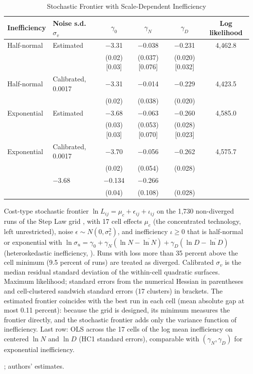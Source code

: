 \begin{table}[tp]
\centering
\caption{Stochastic Frontier with Scale-Dependent Inefficiency}
\label{tab:app-sfa}
\footnotesize
\setlength{\tabcolsep}{4pt}
\begin{tabular}{@{}llcccc@{}}
\toprule
Inefficiency & Noise s.d.\ $\sigma_v$ & $\gamma_0$ & $\gamma_N$ & $\gamma_D$ & Log likelihood \\
\midrule
Half-normal & Estimated & $-$3.31 & $-$0.038 & $-$0.231 & 4,462.8 \\
 & & (0.02) [0.03] & (0.037) [0.076] & (0.020) [0.032] & \\
Half-normal & Calibrated, 0.0017 & $-$3.31 & $-$0.014 & $-$0.229 & 4,423.5 \\
 & & (0.02) & (0.038) & (0.020) & \\
Exponential & Estimated & $-$3.68 & $-$0.063 & $-$0.260 & 4,585.0 \\
 & & (0.03) [0.03] & (0.053) [0.070] & (0.028) [0.023] & \\
Exponential & Calibrated, 0.0017 & $-$3.70 & $-$0.056 & $-$0.262 & 4,575.7 \\
 & & (0.02) & (0.054) & (0.028) & \\
\addlinespace
\multicolumn{2}{@{}l}{Cell-level OLS of $\ln\bar\iota_c$} & $-$3.68 & $-$0.134 & $-$0.266 & \\
 & & (0.04) & (0.108) & (0.028) & \\
\bottomrule
\end{tabular}
\par\smallskip
\begin{tablenotes}Cost-type stochastic frontier $\ln L_{ij}=\mu_c+\epsilon_{ij}+\iota_{ij}$ on the 1,730 non-diverged
runs of the Step Law grid \citep{li2025predictablea}, with 17 cell effects $\mu_c$ (the concentrated technology, left
unrestricted), noise $\epsilon\sim N(0,\sigma_v^2)$, and inefficiency $\iota\geq0$ that is half-normal or exponential
with $\ln\sigma_{u}=\gamma_0+\gamma_N(\ln N-\overline{\ln N})+\gamma_D(\ln D-\overline{\ln D})$ (heteroskedastic
inefficiency, \citealt{caudill1995frontier}). Runs with loss more than 35 percent above the cell minimum (9.5 percent of
runs) are treated as diverged. Calibrated $\sigma_v$ is the median residual standard deviation of the within-cell
quadratic surfaces. Maximum likelihood; standard errors from the numerical Hessian in parentheses and cell-clustered
sandwich standard errors (17 clusters) in brackets. The estimated frontier coincides with the best run in each cell
(mean absolute gap at most 0.11 percent): because the grid is designed, its minimum measures the frontier directly, and
the stochastic frontier adds only the variance function of inefficiency. Last row: OLS across the 17 cells of the log mean inefficiency on centered
$\ln N$ and $\ln D$ (HC1 standard errors), comparable with $(\gamma_N,\gamma_D)$ for exponential
inefficiency.\end{tablenotes}
\begin{tablenotes}[Source]\citet{li2025predictablea}; authors' estimates.\end{tablenotes}
\end{table}
